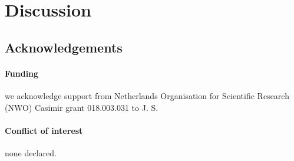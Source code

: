 \documentclass{bioinfo}
\begin{document}
\section{Discussion}


\subsection*{Acknowledgements}
\paragraph*{Funding\textcolon} we acknowledge support from Netherlands Organisation for Scientific Research (NWO) Casimir grant 018.003.031 to J. S.
\paragraph*{Conflict of interest\textcolon} none declared.
\end{document}
